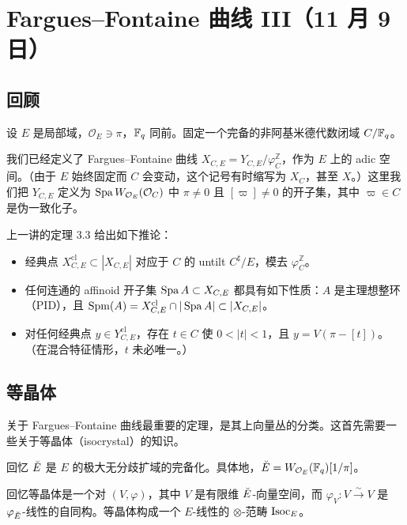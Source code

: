 \section[Fargues--Fontaine 曲线 III]{Fargues--Fontaine 曲线 III（11 月 9 日）}


\subsection{回顾}

设 $E$ 是局部域，$\mathcal{O}_E\ni\pi$，$\mathbb{F}_q$ 同前。固定一个完备的非阿基米德代数闭域 $C/\mathbb{F}_q$。

我们已经定义了 Fargues--Fontaine 曲线 $X_{C,E}=Y_{C,E}/\varphi_C^{\mathbb{Z}}$，作为 $E$ 上的 adic 空间。（由于 $E$ 始终固定而 $C$ 会变动，这个记号有时缩写为 $X_C$，甚至 $X$。）这里我们把 $Y_{C,E}$ 定义为 $\operatorname{Spa} W_{\mathcal{O}_E}(\mathcal{O}_C)$ 中 $\pi\neq0$ 且 $[\varpi]\neq0$ 的开子集，其中 $\varpi\in C$ 是伪一致化子。

上一讲的定理 3.3 给出如下推论：
\begin{itemize}[leftmargin=2em]
  \item 经典点 $X^{\mathrm{cl}}_{C,E}\subset|X_{C,E}|$ 对应于 $C$ 的 untilt $C^{\sharp}/E$，模去 $\varphi_C^{\mathbb{Z}}$。
  \item 任何连通的 affinoid 开子集 $\operatorname{Spa} A\subset X_{C,E}$ 都具有如下性质：$A$ 是主理想整环（PID），且 $\operatorname{Spm}(A)=X^{\mathrm{cl}}_{C,E}\cap|\operatorname{Spa} A|\subset|X_{C,E}|$。
  \item 对任何经典点 $y\in Y^{\mathrm{cl}}_{C,E}$，存在 $t\in C$ 使 $0<|t|<1$，且 $y=V(\pi-[t])$。（在混合特征情形，$t$ 未必唯一。）
\end{itemize}

\subsection{等晶体}

关于 Fargues--Fontaine 曲线最重要的定理，是其上向量丛的分类。这首先需要一些关于等晶体（isocrystal）的知识。

回忆 $\breve{E}$ 是 $E$ 的极大无分歧扩域的完备化。具体地，$\breve{E}=W_{\mathcal{O}_E}(\mathbb{F}_q)[1/\pi]$。

回忆等晶体是一个对 $(V,\varphi)$，其中 $V$ 是有限维 $\breve{E}$-向量空间，而 $\varphi_V\colon V\xrightarrow{\sim}V$ 是 $\varphi_{\breve{E}}$-线性的自同构。等晶体构成一个 $E$-线性的 $\otimes$-范畴 $\operatorname{Isoc}_E$。

